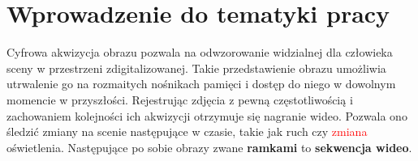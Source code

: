 \chapter{Wprowadzenie do tematyki pracy}
\label{cha:tematykaPracy}
Cyfrowa akwizycja obrazu pozwala na odwzorowanie widzialnej dla człowieka sceny w przestrzeni zdigitalizowanej. Takie przedstawienie obrazu umożliwia utrwalenie go na rozmaitych nośnikach pamięci i dostęp do niego w dowolnym momencie w przyszłości. Rejestrując zdjęcia z pewną częstotliwością i zachowaniem kolejności ich akwizycji otrzymuje się nagranie wideo. Pozwala ono śledzić zmiany na scenie następujące w czasie, takie jak ruch czy \textcolor{red}{zmiana} oświetlenia. Następujące po sobie obrazy zwane \textbf{ramkami} to \textbf{sekwencja wideo}.
